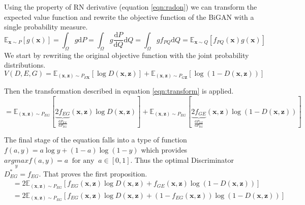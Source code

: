 Using the property of RN derivative (equation \ref{eqn:radon}) we can transform the expected value
function and rewrite the objective function of the BiGAN with a single probability
measure.\cite{Donahue2017AdversarialFL} \cite{Goodfellow:2014:GAN:2969033.2969125}
\begin{equation}
    \label{eqn:transform}
    \mathbb{E}_{\mathbf{x} \sim P}[g(\mathbf{x})]=\int_{\Omega} g \mathrm{d} P=\int_{\Omega} g \frac{\mathrm{d} P}{\mathrm{d} Q} \mathrm{d} Q=\int_{\Omega} g f_{P Q} \mathrm{d} Q=\mathbb{E}_{\mathbf{x} \sim Q}\left[f_{P Q}(\mathbf{x}) g(\mathbf{x})\right]
\end{equation}
We start by rewriting the original objective function with the joint probability distributions.
\begin{equation}
    V(D, E, G) = \mathbb{E}_{(\mathbf{x}, \mathbf{z}) \sim P_{E \mathbf{X}}}[\log D(\mathbf{x}, \mathbf{z})]+\mathbb{E}_{(\mathbf{x}, \mathbf{z}) \sim P_{G \mathbf{Z}}}[\log (1-D(\mathbf{x}, \mathbf{z}))] 
\end{equation}

Then the transformation described in equation \ref{eqn:transform} is applied.
\begin{equation}
    =\mathbb{E}_{(\mathbf{x}, \mathbf{z}) \sim P_{E G}}  [ \underbrace{2 f_{E G}}_{\frac{\mathrm{d} P_{E X}}{\mathrm{d} P_{E G}}}(\mathbf{x}, \mathbf{z}) \log D(\mathbf{x}, \mathbf{z})] +\mathbb{E}_{(\mathbf{x}, \mathbf{z}) \sim P_{E G}}[\underbrace{2 f_{G E}}_{\frac{\mathrm{d} P_{G Z}}{\mathrm{d} P_{E G}}}(\mathbf{x}, \mathbf{z}) \log (1-D(\mathbf{x}, \mathbf{z}))]
\end{equation}

The final stage of the equation falls into a type of function $ f(a,y) = a\log y + (1 -a) \log(1-y)$
\cite{Donahue2017AdversarialFL} which provides $\underset{y}{argmax} f(a,y) = a\ \text{ for any }\ a
\in [0,1]$. Thus the optimal Discriminator $D^*_{EG} = f_{EG}$. That proves the first proposition. 
\begin{align}
    &=2 \mathbb{E}_{(\mathbf{x}, \mathbf{z}) \sim P_{E G}}\left[f_{E G}(\mathbf{x}, \mathbf{z}) \log D(\mathbf{x}, \mathbf{z})+f_{G E}(\mathbf{x}, \mathbf{z}) \log (1-D(\mathbf{x}, \mathbf{z}))\right] \\[5pt]
    &=2 \mathbb{E}_{(\mathbf{x}, \mathbf{z}) \sim P_{E G}}\left[f_{E G}(\mathbf{x}, \mathbf{z}) \log D(\mathbf{x}, \mathbf{z})+\left(1-f_{E G}(\mathbf{x}, \mathbf{z})\right) \log (1-D(\mathbf{x}, \mathbf{z}))\right]
\end{align}

